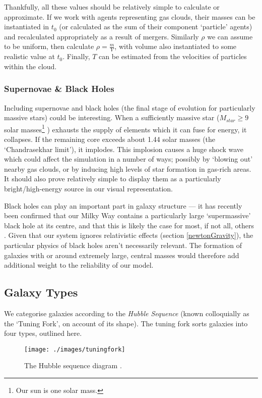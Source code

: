 \documentclass[11pt,a4paper]{article}
\begin{document}
Thankfully, all these values should be relatively simple to calculate or approximate. If we work with agents representing gas clouds, their masses can be instantiated in $t_{0}$ (or calculated as the sum of their component `particle' agents) and recalculated appropriately as a result of mergers. Similarly $\rho$ we can assume to be uniform, then calculate $\rho=\frac{m}{V}$, with volume also instantiated to some realistic value at $t_{0}$. Finally, $T$ can be estimated from the velocities of particles within the cloud.

\subsubsection{Supernovae \& Black Holes}
Including supernovae and black holes (the final stage of evolution for particularly massive stars) could be interesting. When a sufficiently massive star ($M_{star}\geq 9$ solar masses\footnote{Our sun is one solar mass.} \cite{superstar}) exhausts the supply of elements which it can fuse for energy, it collapses. If the remaining core exceeds about 1.44 solar masses (the `Chandrasekhar limit'), it implodes. This implosion causes a huge shock wave which could affect the simulation in a number of ways; possibly by `blowing out' nearby gas clouds, or by inducing high levels of star formation in gas-rich areas. It should also prove relatively simple to display them as a particularly bright/high-energy source in our visual representation.

Black holes can play an important part in galaxy structure --- it has recently been confirmed that our Milky Way contains a particularly large `supermassive' black hole at its centre, and that this is likely the case for most, if not all, others \cite{milkyway, blackHoles}.
Given that our system ignores relativistic effects (section \ref{newtonGravity}), the particular physics of black holes aren't necessarily relevant. The formation of galaxies with or around extremely large, central masses would therefore add additional weight to the reliability of our model. 

\subsection{Galaxy Types}
We categorise galaxies according to the \emph{Hubble Sequence} (known colloquially as the `Tuning Fork', on account of its shape). The tuning fork sorts galaxies into four types, outlined here.
\begin{figure}[h!]
\centering
\texttt{[image: ./images/tuningfork]}
\caption[The Hubble sequence diagram]{The Hubble sequence diagram \cite{tuningFork}.}
\label{tuningForkDiag}
\end{figure}
\end{document}
